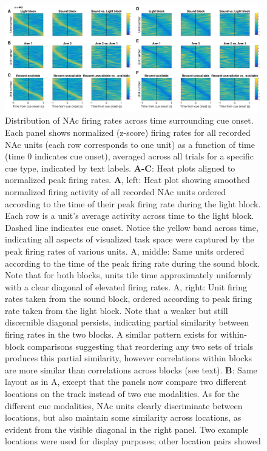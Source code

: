 \documentclass[11pt]{article}
\newcommand{\bsf}[1]{\textbf{#1}}
\begin{document}
 \begin{figure}[ht!]
\centering
\includegraphics[width=\textwidth]{Fig 7 - Task tiling.pdf}
\caption{Distribution of NAc firing rates across time surrounding cue
onset. Each panel shows normalized (z-score) firing rates for all recorded NAc
units (each row corresponds to one unit) as a function of time (time 0
indicates cue onset), averaged across all trials for a specific cue type,
indicated by text labels. \bsf{A-C}: Heat plots aligned to normalized peak
firing rates. \bsf{A}, left: Heat plot showing smoothed normalized firing
activity of all recorded NAc units ordered according to the time of their peak
firing rate during the light block. Each row is a unit’s average activity
across time to the light block. Dashed line indicates cue onset. Notice the
yellow band across time, indicating all aspects of visualized task space were
captured by the peak firing rates of various units. A, middle: Same units
ordered according to the time of the peak firing rate during the sound
block. Note that for both blocks, units tile time approximately uniformly with
a clear diagonal of elevated firing rates. A, right: Unit firing rates
taken from the sound block, ordered according to peak firing rate taken from
the light block. Note that a weaker but still discernible diagonal persists,
indicating partial similarity between firing rates in the two blocks. A similar pattern exists for within-block comparisons suggesting that reordering any two sets of trials
produces this partial similarity, however correlations within blocks are more
similar than correlations across blocks (see text). \bsf{B}: Same layout as in
A, except that the panels now compare two different locations on the track
instead of two cue modalities. As for the different cue modalities, NAc units
clearly discriminate between locations, but also maintain some similarity
across locations, as evident from the visible diagonal in the right panel. Two
example locations were used for display purposes; other location pairs showed
}
\end{figure}
\end{document}
